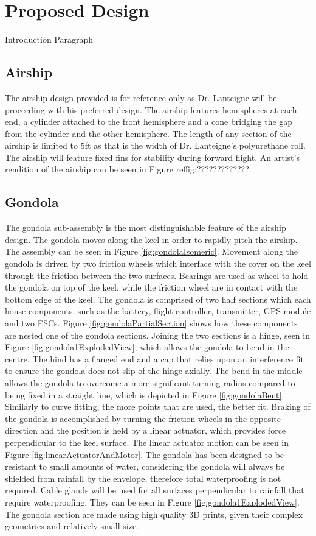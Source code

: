 \documentclass[../main.tex]{subfiles}
\begin{document}
\chapter{Proposed Design}
Introduction Paragraph
\section{Airship}
The airship design provided is for reference only as Dr. Lanteigne will be proceeding with his preferred design. The airship features hemispheres at each end, a cylinder attached to the front hemisphere and a cone bridging the gap from the cylinder and the other hemisphere. The length of any section of the airship is limited to 5ft as that is the width of Dr. Lanteigne's polyurethane roll. The airship will feature fixed fins for stability during forward flight. An artist's rendition of the airship can be seen in Figure ref{fig:?????????????}. 
\section{Gondola}
The gondola sub-assembly is the most distinguishable feature of the airship design. The gondola moves along the keel in order to rapidly pitch the airship. The assembly can be seen in  Figure \ref{fig:gondolaIsomeric}. Movement along the gondola is driven by two friction wheels which interface with the cover on the keel through the friction between the two surfaces. Bearings are used as wheel to hold the gondola on top of the keel, while the friction wheel are in contact with the bottom edge of the keel. The gondola is comprised of two half sections which each house components, such as the battery, flight controller, transmitter, GPS module and two ESCs. Figure \ref{fig:gondolaPartialSection} shows how these components are  nested one of the gondola sections. Joining the two sections is a hinge, seen in Figure  \ref{fig:gondola1ExplodedView}, which allows the gondola to bend in the centre. The hind has a flanged end and a cap that relies upon an interference fit to ensure the gondola does not slip of the hinge axially. The bend in the middle allows the gondola to overcome a more significant turning radius compared to being fixed in a straight line, which is depicted in Figure \ref{fig:gondolaBent}. Similarly to curve fitting, the more points that are used, the better fit. Braking of the gondola is accomplished by turning the friction wheels in the opposite direction and the position is held by a linear actuator, which provides force perpendicular to the keel surface. The linear actuator motion can be seen in Figure \ref{fig:linearActuatorAndMotor}. The gondola has been designed to be resistant to small amounts of water, considering the gondola will always be shielded from rainfall by the envelope, therefore total waterproofing is not required. Cable glands will be used for all surfaces perpendicular to rainfall that require waterproofing. They can be seen in Figure \ref{fig:gondola1ExplodedView}. The gondola section are made using high quality 3D prints, given their complex geometries and relatively small size.
\\
\end{document}
